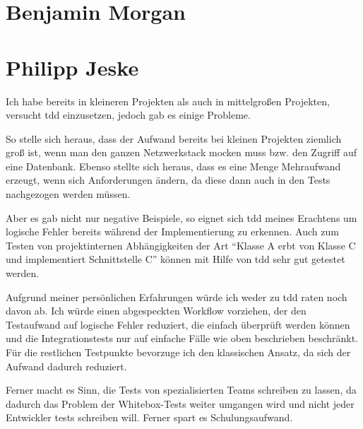 \documentclass{mitschrift}
\newcommand{\pje}{\marginpar{Philipp\\Jeske}}
\newcommand{\bmn}{\marginpar{Benjamin\\Morgan}}
\begin{document}
\section{Benjamin Morgan}
\bmn
\section{Philipp Jeske}
\pje
Ich habe bereits in kleineren Projekten als auch in mittelgroßen Projekten, versucht \gls{tdd} einzusetzen, jedoch gab es einige Probleme. 

So stelle sich heraus, dass der Aufwand bereits bei kleinen Projekten ziemlich groß ist, wenn man den ganzen Netzwerkstack mocken muss bzw. den Zugriff auf eine Datenbank. Ebenso stellte sich heraus, dass es eine Menge Mehraufwand erzeugt, wenn sich Anforderungen ändern, da diese dann auch in den Tests nachgezogen werden müssen.

Aber es gab nicht nur negative Beispiele, so eignet sich \gls{tdd} meines Erachtens um logische Fehler bereits während der Implementierung zu erkennen. Auch zum Testen von projektinternen Abhängigkeiten der Art "`Klasse A erbt von Klasse C und implementiert Schnittstelle C"' können mit Hilfe von \gls{tdd} sehr gut getestet werden.

Aufgrund meiner persönlichen Erfahrungen würde ich weder zu \gls{tdd} raten noch davon ab. Ich würde einen abgespeckten Workflow vorziehen, der den Testaufwand auf logische Fehler reduziert, die einfach überprüft werden können und die Integrationstests nur auf einfache Fälle wie oben beschrieben beschränkt. Für die restlichen Testpunkte bevorzuge ich den klassischen Ansatz, da sich der Aufwand dadurch reduziert.

Ferner macht es Sinn, die Tests von spezialisierten Teams schreiben zu lassen, da dadurch das Problem der Whitebox-Tests weiter umgangen wird und nicht jeder Entwickler tests schreiben will. Ferner spart es Schulungsaufwand.




\printglossary
\end{document}
